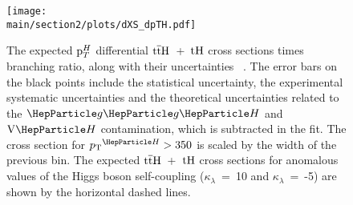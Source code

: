 \begin{figure}[htb!]
        \centering
        \texttt{[image: \\main/section2/plots/dXS\_dpTH.pdf]}
        \caption{The expected $\mathrm{p}_{T}^H$ differential $\text{t}\overline{\text{t}}\text{H}$~+~$\text{tH}$ cross sections times branching ratio, along with their uncertainties ~\cite{CMS-PAS-FTR-18-020}. The error bars on the black points include the statistical uncertainty, the experimental systematic uncertainties and the theoretical uncertainties related to the $\ggh$ and $\vh$ contamination, which is subtracted in the fit.  The cross section for $\pTH > 350$ \UGeV is scaled by the width of the previous bin. The expected $\text{t}\overline{\text{t}}\text{H}$~+~$\text{tH}$ cross sections for anomalous values of the Higgs boson self-coupling ($\kappa_\lambda$~=~10 and $\kappa_\lambda$~=~-5) are shown by the horizontal dashed lines.}
        \label{fig:ttHdiff_CMS_ptH_xs}
\end{figure}

